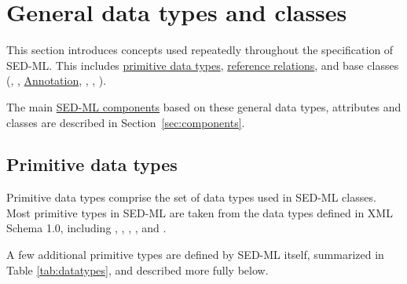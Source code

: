 \section{General data types and classes}
This section introduces concepts used repeatedly throughout the specification of SED-ML. This includes  \hyperref[sec:dataTypes]{primitive data types}, \hyperref[sec:reference]{reference relations}, and base classes (\SedBase, \Notes, \hyperref[class:notes]{Annotation}, \Calculation, \Parameter, \Variable).

The main \hyperref[sec:components]{SED-ML components} based on these general data types, attributes and classes are described in Section~\ref{sec:components}.

\subsection{Primitive data types}
\label{sec:dataTypes}
Primitive data types comprise the set of data types used in SED-ML classes. Most primitive types in SED-ML are taken from the data types defined in XML Schema 1.0, including , , , ,  and . 

A few additional primitive types are defined by SED-ML itself, summarized in Table \ref{tab:datatypes}, and described more fully below.

